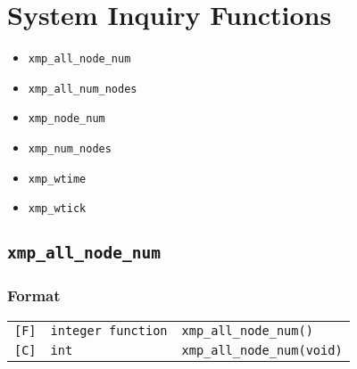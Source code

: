 %
%
%


\section{System Inquiry Functions}

\begin{itemize}
 \item {\tt xmp\_all\_node\_num}
 \item {\tt xmp\_all\_num\_nodes}
 \item {\tt xmp\_node\_num}
 \item {\tt xmp\_num\_nodes}
 \item {\tt xmp\_wtime}
 \item {\tt xmp\_wtick}
\end{itemize}

\subsection{\tt xmp\_all\_node\_num}

\subsubsection*{Format}

\begin{tabular}{lll}

\verb![F]!&  {\tt integer function}& {\tt xmp\_all\_node\_num()}\\

\verb![C]!&  {\tt int}& {\tt xmp\_all\_node\_num(void)}

\end{tabular}

